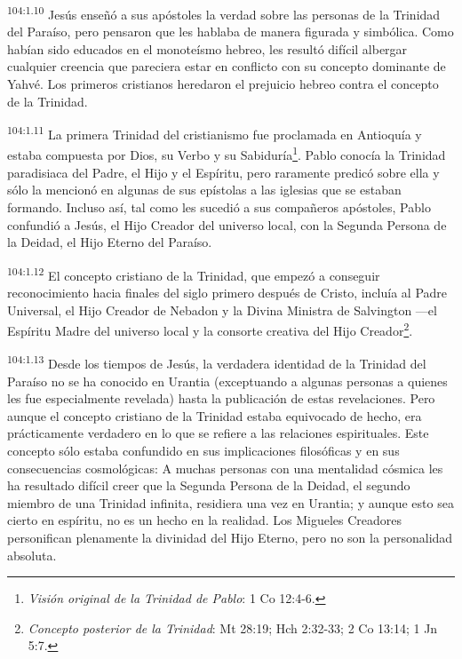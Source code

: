 \documentclass[twoside, 11pt]{book}
\begin{document}
\par
\textsuperscript{104:1.10} Jesús enseñó a sus apóstoles la verdad sobre las personas de la Trinidad del Paraíso, pero pensaron que les hablaba de manera figurada y simbólica. Como habían sido educados en el monoteísmo hebreo, les resultó difícil albergar cualquier creencia que pareciera estar en conflicto con su concepto dominante de Yahvé. Los primeros cristianos heredaron el prejuicio hebreo contra el concepto de la Trinidad.

\par
\textsuperscript{104:1.11} La primera Trinidad del cristianismo fue proclamada en Antioquía y estaba compuesta por Dios, su Verbo y su Sabiduría\footnote{\textit{Visión original de la Trinidad de Pablo}: 1 Co 12:4-6.}. Pablo conocía la Trinidad paradisiaca del Padre, el Hijo y el Espíritu, pero raramente predicó sobre ella y sólo la mencionó en algunas de sus epístolas a las iglesias que se estaban formando. Incluso así, tal como les sucedió a sus compañeros apóstoles, Pablo confundió a Jesús, el Hijo Creador del universo local, con la Segunda Persona de la Deidad, el Hijo Eterno del Paraíso.

\par
\textsuperscript{104:1.12} El concepto cristiano de la Trinidad, que empezó a conseguir reconocimiento hacia finales del siglo primero después de Cristo, incluía al Padre Universal, el Hijo Creador de Nebadon y la Divina Ministra de Salvington ---el Espíritu Madre del universo local y la consorte creativa del Hijo Creador\footnote{\textit{Concepto posterior de la Trinidad}: Mt 28:19; Hch 2:32-33; 2 Co 13:14; 1 Jn 5:7.}.

\par
\textsuperscript{104:1.13} Desde los tiempos de Jesús, la verdadera identidad de la Trinidad del Paraíso no se ha conocido en Urantia (exceptuando a algunas personas a quienes les fue especialmente revelada) hasta la publicación de estas revelaciones. Pero aunque el concepto cristiano de la Trinidad estaba equivocado de hecho, era prácticamente verdadero en lo que se refiere a las relaciones espirituales. Este concepto sólo estaba confundido en sus implicaciones filosóficas y en sus consecuencias cosmológicas: A muchas personas con una mentalidad cósmica les ha resultado difícil creer que la Segunda Persona de la Deidad, el segundo miembro de una Trinidad infinita, residiera una vez en Urantia; y aunque esto sea cierto en espíritu, no es un hecho en la realidad. Los Migueles Creadores personifican plenamente la divinidad del Hijo Eterno, pero no son la personalidad absoluta.
\end{document}
